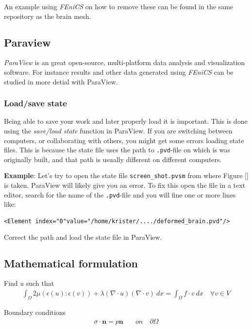 \documentclass[epsfig,11pt]{article}
\begin{document}
An example using \emph{FEniCS} on how to remove these can be found in the same repository as the brain mesh. 

\subsection{Paraview}
\emph{ParaView} is an great open-source, multi-platform data analysis and visualization software. For instance results and other data generated using \emph{FEniCS} can be studied in more detial with ParaView.  

\subsubsection{Load/save state}

Being able to save your work and later properly load it is important. This is done using the \emph{save/load state} function in ParaView. If you are switching between computers, or collaborating with others, you might get some errors loading state files. This is because the state file uses the path to \texttt{.pvd}-file on which is was originally built, and that path is usually different on different computers.

\textbf{Example}: 
Let's try to open the state file \texttt{screen\_shot.pvsm} from where Figure [] is taken. ParaView will likely give you an error. To fix this open the file in a text editor, search for the name of the \texttt{.pvd}-file and you will fine one or more lines like:

\texttt{<Element index="0"value="/home/krister/..../deformed\_brain.pvd"/>}

Correct the path and load the state file in ParaView.


\subsection{Mathematical formulation}

Find $u$ such that 
\begin{align*}
  \int_\Omega  2\mu (\epsilon(u) : \epsilon(v))  +\lambda (\nabla \cdot u) (\nabla \cdot v) \: dx = \int_\Omega f \cdot v \: dx \quad \forall v \in V
\end{align*} 

Boundary conditions
\begin{align*}
\sigma \cdot \mathbf{n} = p\mathbf{n} \quad &on \quad \partial \Omega
\end{align*}
\end{document}
